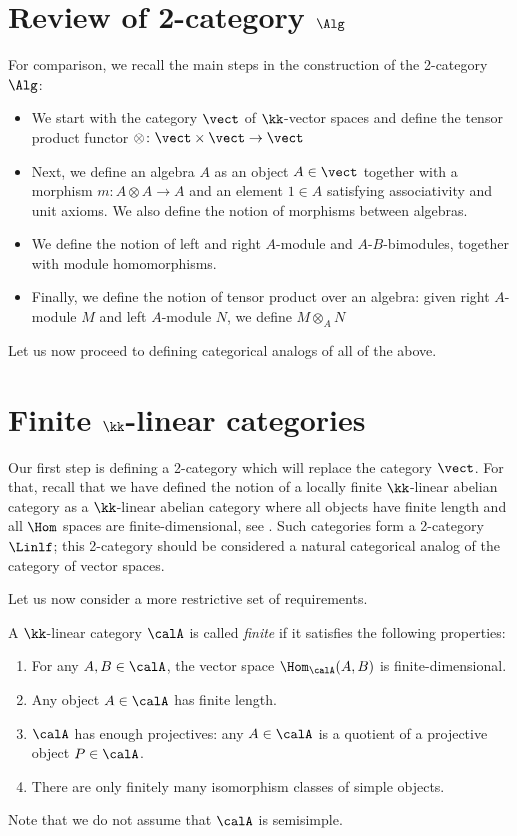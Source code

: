 \section{Review of 2-category $\Alg$}\label{s:alg-review}
For comparison, we recall the main steps in the construction of the 2-category $\Alg$:
\begin{itemize}
  \item We start with the category $\vect$ of $\kk$-vector spaces and define
    the tensor product functor $\otimes\colon\vect\times\vect \to \vect$
  \item Next, we define an algebra $A$ as an object $A\in\vect$ together with
    a morphism $m\colon A\otimes A\to A$ and an element $1\in A$ satisfying
    associativity and unit axioms. We also define the notion of morphisms between
    algebras.
  \item We define the notion of left and right $A$-module and $A$-$B$-bimodules,
  together with module homomorphisms.
  \item Finally, we define the notion of tensor product over an algebra: given right
  $A$-module $M$ and left $A$-module $N$, we define $M\otimes_A N$
\end{itemize}

Let us now proceed to defining categorical analogs of all of the above.

\section{Finite $\kk$-linear categories}\label{s:finite-categories}
Our first step is defining a 2-category which will replace the category $\vect$.
For that, recall that we have defined the notion of a locally finite
$\kk$-linear abelian category as a $\kk$-linear abelian category where all
objects have finite length and all $\Hom$ spaces are finite-dimensional, see
. Such categories form a 2-category $\Linlf$; this
2-category should be considered a natural categorical analog of the category of
vector spaces.

Let us now consider a more restrictive set of requirements.

\begin{definition}\label{d:finite-linear}
  A $\kk$-linear category $\calA$ is called \emph{finite}
   if it satisfies the
  following properties:
  \begin{enumerate}
    \item For any $A,B\in \calA$, the vector space $\Hom_\calA(A,B)$ is
      finite-dimensional.

    \item Any object $A\in \calA$ has finite length.
    \item $\calA$ has enough projectives: any $A\in \calA$ is a quotient of
     a projective object $P\in \calA$.
    \item There are only finitely many isomorphism classes of simple objects.
  \end{enumerate}
\end{definition}
Note that we do not assume that $\calA$ is semisimple.

